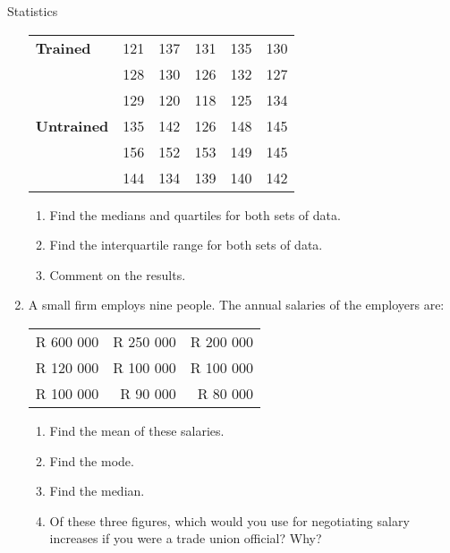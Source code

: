 \begin{eocexercises}{Statistics}
\begin{enumerate}[noitemsep, label=\textbf{\arabic*}.]
    \begin{center}
      \begin{tabular}{lccccc}
        \toprule
        \textbf{Trained} & 121 & 137 & 131 & 135 & 130 \\
                         & 128 & 130 & 126 & 132 & 127 \\
                         & 129 & 120 & 118 & 125 & 134 \\
        \midrule
        \textbf{Untrained} & 135 & 142 & 126 & 148 & 145 \\
                           & 156 & 152 & 153 & 149 & 145 \\
                           & 144 & 134 & 139 & 140 & 142 \\
        \bottomrule
      \end{tabular}
    \end{center}
    \begin{enumerate}
    \item Find the medians and quartiles for both sets of data.
    \item Find the interquartile range for both sets of data.
    \item Comment on the results.
    \end{enumerate}

  \item A small firm employs nine people. The annual salaries of the employers are:
    \begin{center}
      \begin{tabular}{rrr}
        \toprule
        R 600 000 & R 250 000 & R 200 000 \\
        R 120 000 & R 100 000 & R 100 000 \\
        R 100 000 & R  90 000 & R  80 000 \\
        \bottomrule
      \end{tabular}
    \end{center}
    \begin{enumerate}
    \item Find the mean of these salaries.
    \item Find the mode.
    \item Find the median.
    \item Of these three figures, which would you use for
      negotiating salary increases if you were a trade union
      official? Why?
    \end{enumerate}

  \end{enumerate}
\end{eocexercises}
